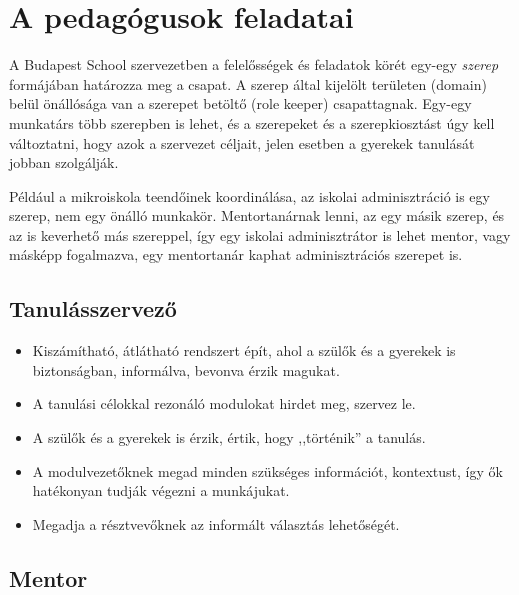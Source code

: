 \section{A pedagógusok feladatai}\label{sec:tanarfeladatok}

A Budapest School szervezetben a felelősségek és feladatok körét egy-egy \emph{szerep} formájában határozza meg a csapat. A szerep által kijelölt területen (domain) belül önállósága van a szerepet betöltő (role keeper) csapattagnak. Egy-egy munkatárs több szerepben is lehet, és a szerepeket és a szerepkiosztást úgy kell változtatni, hogy azok a szervezet céljait, jelen esetben a gyerekek tanulását jobban szolgálják.

Például a mikroiskola teendőinek koordinálása, az iskolai adminisztráció is egy szerep, nem egy önálló munkakör.  Mentortanárnak lenni, az egy másik szerep, és az is keverhető más szereppel, így egy iskolai adminisztrátor is lehet men\-tor, vagy másképp fogalmazva, egy mentortanár kaphat adminisztrációs szerepet is.



\subsection{Tanulásszervező}\label{sec:tanulasszervezo}
\begin{itemize}
    \item Kiszámítható, átlátható rendszert épít, ahol a szülők és a gyerekek is biztonságban, informálva, bevonva érzik magukat.
    \item A tanulási célokkal rezonáló modulokat hirdet meg, szervez le.
    \item A szülők és a gyerekek is érzik, értik, hogy ,,történik'' a tanulás.
    \item A modulvezetőknek megad minden szükséges információt, kontextust, így ők hatékonyan tudják végezni a munkájukat.
    \item Megadja a résztvevőknek az informált választás lehetőségét.
\end{itemize}

\subsection{Mentor}\label{mentor}

